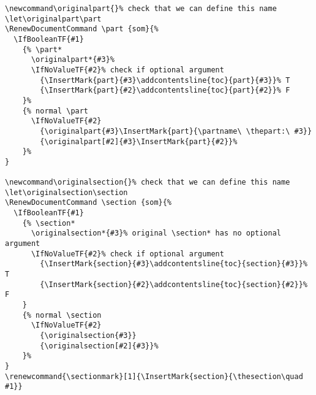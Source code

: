\documentclass{article}
\newcommand\originalpart{}%
\let\originalpart\part
\newcommand\originalsection{}%
\let\originalsection\section
\renewcommand{\sectionmark}[1]{\InsertMark{section}{\thesection\quad #1}}
\begin{document}
\noindent
\begin{boxedminipage}{\textwidth}
{\small\begin{verbatim}
\newcommand\originalpart{}% check that we can define this name
\let\originalpart\part
\RenewDocumentCommand \part {som}{%
  \IfBooleanTF{#1}
    {% \part*
      \originalpart*{#3}%
      \IfNoValueTF{#2}% check if optional argument
        {\InsertMark{part}{#3}\addcontentsline{toc}{part}{#3}}% T
        {\InsertMark{part}{#2}\addcontentsline{toc}{part}{#2}}% F
    }%
    {% normal \part
      \IfNoValueTF{#2}
        {\originalpart{#3}\InsertMark{part}{\partname\ \thepart:\ #3}}
        {\originalpart[#2]{#3}\InsertMark{part}{#2}}%
    }%
}

\newcommand\originalsection{}% check that we can define this name
\let\originalsection\section
\RenewDocumentCommand \section {som}{%
  \IfBooleanTF{#1}
    {% \section*
      \originalsection*{#3}% original \section* has no optional argument
      \IfNoValueTF{#2}% check if optional argument
        {\InsertMark{section}{#3}\addcontentsline{toc}{section}{#3}}% T
        {\InsertMark{section}{#2}\addcontentsline{toc}{section}{#2}}% F
    }
    {% normal \section
      \IfNoValueTF{#2}
        {\originalsection{#3}}
        {\originalsection[#2]{#3}}%
    }%
}
\renewcommand{\sectionmark}[1]{\InsertMark{section}{\thesection\quad #1}}
\end{verbatim}}
\end{boxedminipage}
\end{document}
